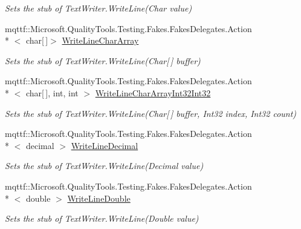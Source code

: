 \begin{DoxyCompactItemize}
\begin{DoxyCompactList}\small\item\em Sets the stub of Text\-Writer.\-Write\-Line(\-Char value)\end{DoxyCompactList}\item 
mqttf\-::\-Microsoft.\-Quality\-Tools.\-Testing.\-Fakes.\-Fakes\-Delegates.\-Action\\*
$<$ char\mbox{[}$\,$\mbox{]}$>$ \hyperlink{class_system_1_1_i_o_1_1_fakes_1_1_stub_string_writer_a4385b7c340201c525bbc0903bf511be5}{Write\-Line\-Char\-Array}
\begin{DoxyCompactList}\small\item\em Sets the stub of Text\-Writer.\-Write\-Line(\-Char\mbox{[}$\,$\mbox{]} buffer)\end{DoxyCompactList}\item 
mqttf\-::\-Microsoft.\-Quality\-Tools.\-Testing.\-Fakes.\-Fakes\-Delegates.\-Action\\*
$<$ char\mbox{[}$\,$\mbox{]}, int, int $>$ \hyperlink{class_system_1_1_i_o_1_1_fakes_1_1_stub_string_writer_ab92717a8d04a93badef863262338919e}{Write\-Line\-Char\-Array\-Int32\-Int32}
\begin{DoxyCompactList}\small\item\em Sets the stub of Text\-Writer.\-Write\-Line(\-Char\mbox{[}$\,$\mbox{]} buffer, Int32 index, Int32 count)\end{DoxyCompactList}\item 
mqttf\-::\-Microsoft.\-Quality\-Tools.\-Testing.\-Fakes.\-Fakes\-Delegates.\-Action\\*
$<$ decimal $>$ \hyperlink{class_system_1_1_i_o_1_1_fakes_1_1_stub_string_writer_a1ef3fe2f80b2b1696712d556eabffd5e}{Write\-Line\-Decimal}
\begin{DoxyCompactList}\small\item\em Sets the stub of Text\-Writer.\-Write\-Line(\-Decimal value)\end{DoxyCompactList}\item 
mqttf\-::\-Microsoft.\-Quality\-Tools.\-Testing.\-Fakes.\-Fakes\-Delegates.\-Action\\*
$<$ double $>$ \hyperlink{class_system_1_1_i_o_1_1_fakes_1_1_stub_string_writer_ad60726f3f5aec5807eea481cf789a5f3}{Write\-Line\-Double}
\begin{DoxyCompactList}\small\item\em Sets the stub of Text\-Writer.\-Write\-Line(\-Double value)\end{DoxyCompactList}\item 

\end{DoxyCompactItemize}
